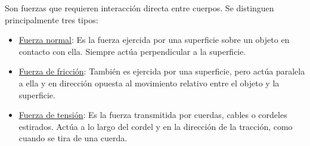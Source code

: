 \documentclass{article}
\begin{document}
        \par Son fuerzas que requieren interacción directa entre cuerpos. Se distinguen principalmente tres tipos:

        \begin{itemize}
            \item \underline{Fuerza normal}: Es la fuerza ejercida por una superficie sobre un objeto en contacto con ella. Siempre actúa perpendicular a la superficie.
            \item \underline{Fuerza de fricción}: También es ejercida por una superficie, pero actúa paralela a ella y en dirección opuesta al movimiento relativo entre el objeto y la superficie.
            \item \underline{Fuerza de tensión}: Es la fuerza transmitida por cuerdas, cables o cordeles estirados. Actúa a lo largo del cordel y en la dirección de la tracción, como cuando se tira de una cuerda.
        \end{itemize}
\end{document}

